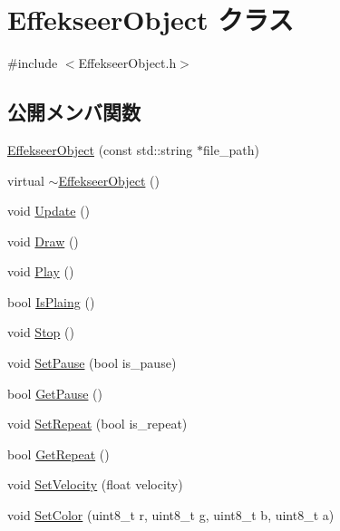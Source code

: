 \hypertarget{class_effekseer_object}{}\section{Effekseer\+Object クラス}
\label{class_effekseer_object}


{\ttfamily \#include $<$Effekseer\+Object.\+h$>$}

\subsection*{公開メンバ関数}
\begin{DoxyCompactItemize}
\item 
\mbox{\hyperlink{class_effekseer_object_a8e1e081f62efa87b31e00bcfd9cf1a45}{Effekseer\+Object}} (const std\+::string $\ast$file\+\_\+path)
\item 
virtual \mbox{\hyperlink{class_effekseer_object_a0463ba508e3c83576991138465847054}{$\sim$\+Effekseer\+Object}} ()
\item 
void \mbox{\hyperlink{class_effekseer_object_aecb9314a5ff922c9420301129d2f26f7}{Update}} ()
\item 
void \mbox{\hyperlink{class_effekseer_object_adc628e5089ca0cdc418e92729943a3b2}{Draw}} ()
\item 
void \mbox{\hyperlink{class_effekseer_object_a59c8a12b4eb558449622660d892b3cf4}{Play}} ()
\item 
bool \mbox{\hyperlink{class_effekseer_object_a6fe253dd3387bdfd9305878ff194f305}{Is\+Plaing}} ()
\item 
void \mbox{\hyperlink{class_effekseer_object_adfbdfbe202b78441b33d76656453e536}{Stop}} ()
\item 
void \mbox{\hyperlink{class_effekseer_object_aeec933c68ceb4bafc69d65590c470d72}{Set\+Pause}} (bool is\+\_\+pause)
\item 
bool \mbox{\hyperlink{class_effekseer_object_a482a0e824d8719b7676ae15948ae7348}{Get\+Pause}} ()
\item 
void \mbox{\hyperlink{class_effekseer_object_a77122f2d71d44d6cceec2b6bdedb4b2a}{Set\+Repeat}} (bool is\+\_\+repeat)
\item 
bool \mbox{\hyperlink{class_effekseer_object_a3c44b29c016fb5b3618e2d39060844be}{Get\+Repeat}} ()
\item 
void \mbox{\hyperlink{class_effekseer_object_a3c14fd4215640b648b14e445b99564f7}{Set\+Velocity}} (float velocity)
\item 
void \mbox{\hyperlink{class_effekseer_object_a5c496e56785ef7b784b13642d59d4e7f}{Set\+Color}} (uint8\+\_\+t r, uint8\+\_\+t g, uint8\+\_\+t b, uint8\+\_\+t a)

\end{DoxyCompactItemize}
